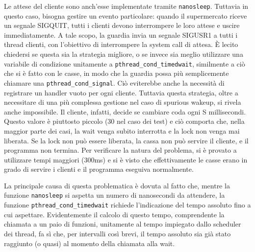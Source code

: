 \documentclass[a4paper,11pt] {article}
\begin{document}
Le attese del cliente sono anch'esse implementate tramite \lstinline{nanosleep}. Tuttavia in questo caso, bisogna gestire un evento particolare: quando il supermercato riceve un segnale SIGQUIT, tutti i clienti devono interrompere le loro attese e uscire immediatamente. A tale scopo, la guardia invia un segnale SIGUSR1 a tutti i thread clienti, con l'obiettivo di interrompere la system call di attesa. È lecito chiedersi se questa sia la strategia migliore, o se invece sia meglio utilizzare una variabile di condizione unitamente a \lstinline{pthread_cond_timedwait}, similmente a ciò che si è fatto con le casse, in modo che la guardia possa più semplicemente chiamare una \lstinline{pthread_cond_signal}. Ciò eviterebbe anche la necessità di registrare un handler vuoto per ogni cliente. Tuttavia questa strategia, oltre a necessitare di una più complessa gestione nel caso di spurious wakeup, si rivela anche impossibile. Il cliente, infatti, decide se cambiare coda ogni S millisecondi. Questo valore è piuttosto piccolo (30 nel caso dei test) e ciò comporta che, nella maggior parte dei casi, la wait venga subito interrotta e la lock non venga mai liberata. Se la lock non può essere liberata, la cassa non può servire il cliente, e il programma non termina. Per verificare la natura del problema, si è provato a utilizzare tempi maggiori (300ms) e si è visto che effettivamente le casse erano in grado di servire i clienti e il programma eseguiva normalmente.

La principale causa di questa problematica è dovuta al fatto che, mentre la funzione \lstinline{nanosleep} si aspetta un numero di nanosecondi da attendere, la funzione \lstinline{pthread_cond_timedwait} richiede l'indicazione del tempo assoluto fino a cui aspettare. Evidentemente il calcolo di questo tempo, comprendente la chiamata a un paio di funzioni, unitamente al tempo impiegato dallo scheduler dei thread, fa sì che, per intervalli così brevi, il tempo assoluto sia già stato raggiunto (o quasi) al momento della chiamata alla wait.
\end{document}
